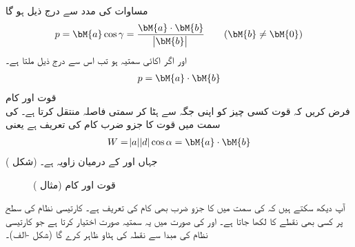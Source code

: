 مساوات  کی مدد سے درج ذیل ہو گا
\begin{align}\label{مساوات_الجبرا_عمودی_سایہ_الف}
p=\bM{a}\cos \gamma=\frac{\bM{a}\cdot\bM{b}}{\abs{\bM{b}}} \quad \quad (\bM{b}\ne \bM{0})
\end{align}
اور اگر  اکائی سمتیہ ہو تب اس سے درج ذیل ملتا ہے۔
\begin{align}\label{مساوات_الجبرا_عمودی_سایہ_ب}
p=\bM{a}\cdot\bM{b}
\end{align}
\quad قوت اور کام\\
فرض کریں کہ قوت  کسی چیز کو اپنی جگہ سے ہٹا کر سمتی فاصلہ  منتقل کرتا ہے۔ کی سمت میں قوت کا جزو ضرب  کام  کی تعریف ہے یعنی
\begin{align}
W=\abs{a}\abs{d}\cos \alpha=\bM{a}\cdot \bM{b}
\end{align} 
جہاں  اور  کے درمیان زاویہ  ہے۔ (شکل )
\begin{figure}
\centering
{}
\caption{قوت اور کام (مثال )}
\label{شکل_مثال_الجبرا_قوت_کام}
\end{figure}

آپ دیکھ سکتے ہیں کہ  کی سمت میں  کا جزو ضرب  بھی کام کی تعریف ہے۔
کارتیسی نظام کی  سطح پر  کسی بھی نقطے کا     لکھا جاتا ہے۔ اور  کی صورت میں یہ سمتیہ  صورت اختیار کرتا ہے جو کارتیسی نظام کی مبدا سے نقطہ  کی ہٹاو ظاہر کرے گا (شکل -الف)۔

